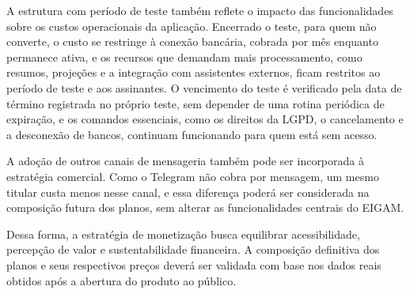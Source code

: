 A estrutura com período de teste também reflete o impacto das funcionalidades sobre os custos operacionais da aplicação. Encerrado o teste, para quem não converte, o custo se restringe à conexão bancária, cobrada por mês enquanto permanece ativa, e os recursos que demandam mais processamento, como resumos, projeções e a integração com assistentes externos, ficam restritos ao período de teste e aos assinantes. O vencimento do teste é verificado pela data de término registrada no próprio teste, sem depender de uma rotina periódica de expiração, e os comandos essenciais, como os direitos da LGPD, o cancelamento e a desconexão de bancos, continuam funcionando para quem está sem acesso.

A adoção de outros canais de mensageria também pode ser incorporada à estratégia comercial. Como o Telegram não cobra por mensagem, um mesmo titular custa menos nesse canal, e essa diferença poderá ser considerada na composição futura dos planos, sem alterar as funcionalidades centrais do EIGAM.

Dessa forma, a estratégia de monetização busca equilibrar acessibilidade, percepção de valor e sustentabilidade financeira. A composição definitiva dos planos e seus respectivos preços deverá ser validada com base nos dados reais obtidos após a abertura do produto ao público.
